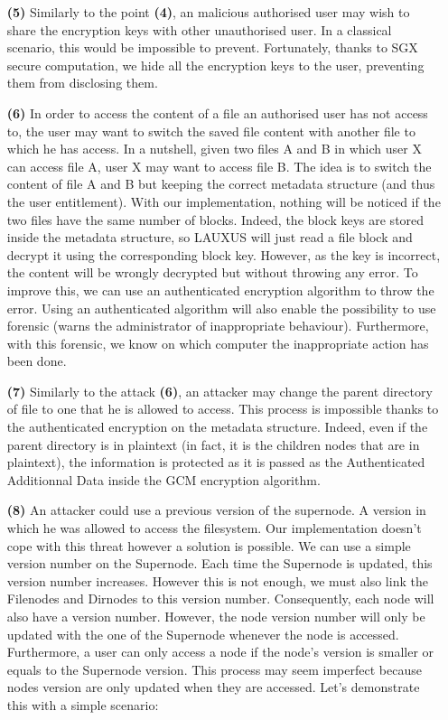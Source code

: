 \documentclass[../main.tex]{subfiles}
\begin{document}
\begin{itemize}
    \item[\textbf{(5)}] Similarly to the point \textbf{(4)}, an malicious authorised user may wish to share the encryption keys with other unauthorised user. In a classical scenario, this would be impossible to prevent. Fortunately, thanks to SGX secure computation, we hide all the encryption keys to the user, preventing them from disclosing them.
    \item[\textbf{(6)}] In order to access the content of a file an authorised user has not access to, the user may want to switch the saved file content with another file to which he has access. In a nutshell, given two files A and B in which user X can access file A, user X may want to access file B. The idea is to switch the content of file A and B but keeping the correct metadata structure (and thus the user entitlement). With our implementation, nothing will be noticed if the two files have the same number of blocks. Indeed, the block keys are stored inside the metadata structure, so LAUXUS will just read a file block and decrypt it using the corresponding block key. However, as the key is incorrect, the content will be wrongly decrypted but without throwing any error. To improve this, we can use an authenticated encryption algorithm to throw the error. Using an authenticated algorithm will also enable the possibility to use forensic (warns the administrator of inappropriate behaviour). Furthermore, with this forensic, we know on which computer the inappropriate action has been done.
    \item[\textbf{(7)}] Similarly to the attack \textbf{(6)}, an attacker may change the parent directory of file to one that he is allowed to access. This process is impossible thanks to the authenticated encryption on the metadata structure. Indeed, even if the parent directory is in plaintext (in fact, it is the children nodes that are in plaintext), the information is protected as it is passed as the Authenticated Additionnal Data inside the GCM encryption algorithm.
    \item[\textbf{(8)}] An attacker could use a previous version of the supernode. A version in which he was allowed to access the filesystem. Our implementation doesn't cope with this threat however a solution is possible. We can use a simple version number on the Supernode. Each time the Supernode is updated, this version number increases. However this is not enough, we must also link the Filenodes and Dirnodes to this version number. Consequently, each node will also have a version number. However, the node version number will only be updated with the one of the Supernode whenever the node is accessed. Furthermore, a user can only access a node if the node's version is smaller or equals to the Supernode version. This process may seem imperfect because nodes version are only updated when they are accessed. Let's demonstrate this with a simple scenario:

\end{itemize}
\end{document}
